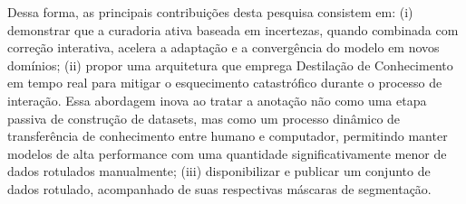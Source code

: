 
Dessa forma, as principais contribuições desta pesquisa consistem em: (i) demonstrar que a curadoria ativa baseada em incertezas, quando combinada com correção interativa, acelera a adaptação e a convergência do modelo em novos domínios; (ii) propor uma arquitetura que emprega Destilação de Conhecimento em tempo real para mitigar o esquecimento catastrófico durante o processo de interação. Essa abordagem inova ao tratar a anotação não como uma etapa passiva de construção de datasets, mas como um processo dinâmico de transferência de conhecimento entre humano e computador, permitindo manter modelos de alta performance com uma quantidade significativamente menor de dados rotulados manualmente; (iii) disponibilizar e publicar um conjunto de dados rotulado, acompanhado de suas respectivas máscaras de segmentação.



